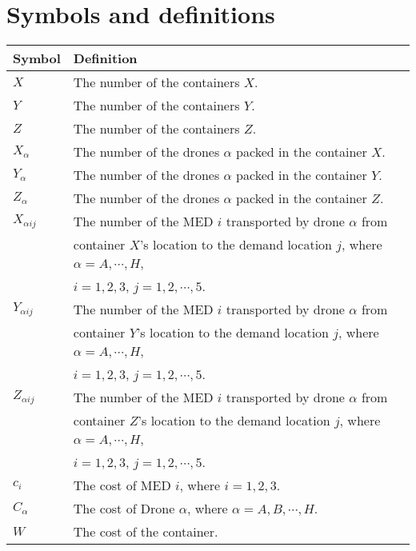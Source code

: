 \documentclass{mcmthesis}
\begin{document}
\section{Symbols and definitions}
\renewcommand\arraystretch{1.5}
\begin{tabular}{ll}
	\hline
	Symbol&  Definition\\
	\hline
	$X$& The number of the containers $X$.\\
	
	$Y$& The number of the containers $Y$.\\
	
	$Z$& The number of the containers $Z$.\\
	
	$X_\alpha$& The number of the drones $\alpha$ packed in the container $X$.\\
	
	$Y_\alpha$& The number of the drones $\alpha$ packed in the container $Y$.\\
	
	$Z_\alpha$& The number of the drones $\alpha$ packed in the container $Z$.\\
	
	$X_{\alpha ij}$& The number of the MED $i$ transported by drone $\alpha$ from\\	 
	& container $X$'s location to the demand location $j$, where $\alpha=A,\cdots,H$,\\ 
	& $i=1,2,3$, $j=1,2,\cdots,5$.\\
	
	$Y_{\alpha ij}$& The number of the MED $i$ transported by drone $\alpha$ from \\
	&container $Y$'s location to the demand location $j$, where $\alpha=A,\cdots,H$,\\
	& $i=1,2,3$, $j=1,2,\cdots,5$.\\
	
	$Z_{\alpha ij}$& The number of the MED $i$ transported by drone $\alpha$ from \\
	&container $Z$'s location to the demand location $j$, where $\alpha=A,\cdots,H$,\\ 
	&$i=1,2,3$, $j=1,2,\cdots,5$.\\
	
	$c_i$& The cost of MED $i$, where $i=1,2,3$.\\
	
	$C_\alpha$& The cost of Drone $\alpha$, where $\alpha=A,B,\cdots,H$.\\
	
	 $W$& The cost of the container.\\
	

\end{tabular}
\end{document}
